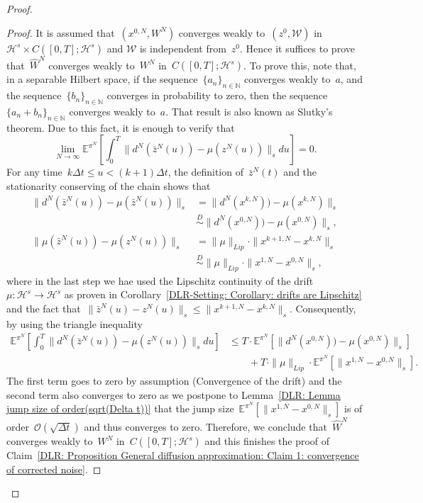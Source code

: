 \begin{proof}
\begin{proof}
    It is assumed that~$(x^{0,N}, W^N)$ converges weakly to~$(z^0, \mathcal{W})$ in $\mathcal{H}^s \times C([0,T]; \mathcal{H}^s)$ and $\mathcal{W}$ is independent from~$z^0$. Hence it suffices to prove that~$\widehat{W}^N$ converges weakly to~$W^N$ in~$C([0,T]; \mathcal{H}^s)$. To prove this, note that, in a separable Hilbert space, if the sequence~$\{ a_n \}_{n \in \mathbb{N}}$ converges weakly to~$a$, and the sequence~$\{ b_n \}_{n \in \mathbb{N}}$ converges in probability to zero, then the sequence~$\{ a_n + b_n \}_{n \in \mathbb{N}}$ converges weakly to~$a$. That result is also known as Slutky's theorem. Due to this fact, it is enough to verify that
    \begin{equation}
      \lim_{N\to \infty} \mathbb{E}^{\pi^N} \left[ \int_0^T  \| d^N(\bar{z}^N(u)) - \mu(z^N(u)) \|_s du \right] = 0.
    \end{equation}
    For any time~$ k \Delta t \leq u < (k+1)\Delta t $, the definition of~$\bar{z}^N(t)$ and the stationarity conserving of the chain shows that
    \begin{align*}
      \| d^N(\bar{z}^N(u)) - \mu(\bar{z}^N(u)) \|_s & = \| d^N(x^{k,N})) - \mu(x^{k,N}) \|_s \\
      & \stackrel{D}{\sim} \| d^N(x^{0,N})) - \mu(x^{0,N}) \|_s, \\
      \| \mu(\bar{z}^N(u)) - \mu(z^N(u)) \|_s & = \|  \mu \|_{Lip} \cdot \| x^{k+1,N} - x^{k,N} \|_s \\
      & \stackrel{D}{\sim} \|  \mu \|_{Lip} \cdot \| x^{1,N} - x^{0,N} \|_s,
    \end{align*}
    where in the last step we hae used the Lipschitz continuity of the drift~$\mu: \mathcal{H}^s \to \mathcal{H}^s$ as proven in Corollary~\ref{DLR-Setting: Corollary: drifts are Lipschitz} and the fact that~$\| \bar{z}^N(u) - z^N(u) \|_s \leq \| x^{k+1,N} - x^{k,N} \|_s$.  Consequently, by using the triangle inequality
    \begin{align*}
     \mathbb{E}^{\pi^N} \left[ \int_0^T  \| d^N(\bar{z}^N(u)) - \mu(z^N(u)) \|_s du \right] & \leq T \cdot \mathbb{E}^{\pi^N} \left[ \| d^N(x^{0,N})) - \mu(x^{0,N}) \|_s \right] \\
     & \qquad + T \cdot  \|  \mu \|_{Lip} \cdot  \mathbb{E}^{\pi^N} \left[ \| x^{1,N} - x^{0,N} \|_s \right] .
    \end{align*}
    The first term goes to zero by assumption (Convergence of the drift) and the second term also converges to zero as we postpone to Lemma~\ref{DLR: Lemma jump size of order(sqrt(Delta t))} that the jump size~$\mathbb{E}^{\pi^N} \left[ \| x^{1,N} - x^{0,N} \|_s \right]$ is of order~$\mathcal{O}(\sqrt{\Delta t})$ and thus converges to zero. Therefore, we conclude that~$\widehat{W}^N$ converges weakly to~$W^N$ in~$C([0,T]; \mathcal{H}^s)$ and this finishes the proof of Claim~\ref{DLR: Proposition General diffusion approximation: Claim 1: convergence of corrected noise}.
  \end{proof}   
  

\end{proof}
